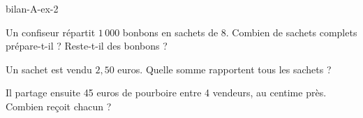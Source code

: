 \begin{blocEdition}{bilan-A-ex-2}
\begin{questions}
\item Un confiseur répartit $1\,000$ bonbons en sachets de 8. Combien de sachets complets prépare-t-il ? Reste-t-il des bonbons ?
\item Un sachet est vendu $2{,}50$ euros. Quelle somme rapportent tous les sachets ?
\item Il partage ensuite 45 euros de pourboire entre 4 vendeurs, au centime près. Combien reçoit chacun ?
\end{questions}\par{}\par\par{}\par{}\par{}\par{}\par{}\par{}
\end{blocEdition}
